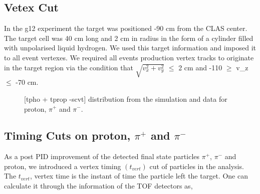 \documentclass[12pt,a4paper]{amsbook}
\theoremstyle{definition}
\begin{document}
\subsection{Vetex Cut}
\label{VCut}
In the g12 experiment the target was positioned -90 cm from the CLAS center. The target cell was 40 cm long and 2 cm in radius in the form of a cylinder filled with unpolarised liquid hydrogen. We used this target information and imposed it to all event vertexes. We required all events  production vertex tracks to originate in the target region via the condition that $\sqrt{v_{x}^{2} + v_{y}^{2}}$ $\leq$ 2 cm and -110 $\geq$ v_{z} $\leq$ -70 cm. 

\begin{figure}[ht!]
\centerline{
}
\caption{[tpho + tprop -scvt] distribution from the simulation and data for proton, $\pi^{+}$ and $\pi^{-}$.}
\label{Fig1}
\end{figure}

\subsection{Timing Cuts on proton, $\pi^{+}$ and $\pi^{-}$}
\label{TCut}
As a post PID improvement of the detected final state particles $\pi^{+}$, $\pi^{-}$ and proton, we introduced a vertex timing $(t_{vert})$ cut of particles in the analysis. The $t_{vert}$, vertex time is the instant of time the particle left the target. One can calculate it through the information of the TOF detectors as,
\end{document}

